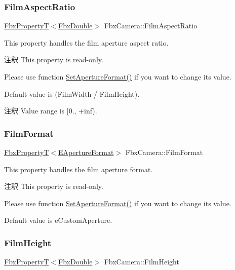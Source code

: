 \subsubsection{\texorpdfstring{Film\+Aspect\+Ratio}{FilmAspectRatio}}
{\footnotesize\ttfamily \hyperlink{class_fbx_property_t}{Fbx\+PropertyT}$<$\hyperlink{fbxtypes_8h_a171e72a1c46fc15c1a6c9c31948c1c5b}{Fbx\+Double}$>$ Fbx\+Camera\+::\+Film\+Aspect\+Ratio}

This property handles the film aperture aspect ratio.

\begin{DoxyRemark}{注釈}
This property is read-\/only. 

Please use function \hyperlink{class_fbx_camera_a5b644b41e4d72c214acfdb5a2dee7576}{Set\+Aperture\+Format()} if you want to change its value.
\end{DoxyRemark}
Default value is (Film\+Width / Film\+Height). \begin{DoxyRemark}{注釈}
Value range is \mbox{[}0., +inf). 
\end{DoxyRemark}
\mbox{\label{class_fbx_camera_a49ebaef59ee49281225e2d0652894a4f}} 
\subsubsection{\texorpdfstring{Film\+Format}{FilmFormat}}
{\footnotesize\ttfamily \hyperlink{class_fbx_property_t}{Fbx\+PropertyT}$<$\hyperlink{class_fbx_camera_ac26ac89602453c5917882c69d4863d13}{E\+Aperture\+Format}$>$ Fbx\+Camera\+::\+Film\+Format}

This property handles the film aperture format.

\begin{DoxyRemark}{注釈}
This property is read-\/only. 

Please use function \hyperlink{class_fbx_camera_a5b644b41e4d72c214acfdb5a2dee7576}{Set\+Aperture\+Format()} if you want to change its value.
\end{DoxyRemark}
Default value is e\+Custom\+Aperture. \mbox{\label{class_fbx_camera_ae8e2abec912de996c4eaaff987a3bd17}} 
\subsubsection{\texorpdfstring{Film\+Height}{FilmHeight}}
{\footnotesize\ttfamily \hyperlink{class_fbx_property_t}{Fbx\+PropertyT}$<$\hyperlink{fbxtypes_8h_a171e72a1c46fc15c1a6c9c31948c1c5b}{Fbx\+Double}$>$ Fbx\+Camera\+::\+Film\+Height}

